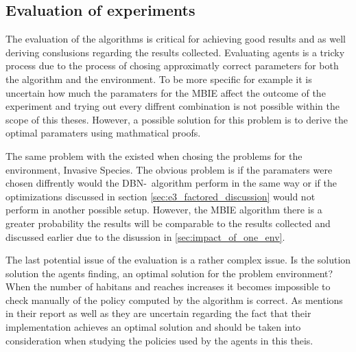 \subsection{Evaluation of experiments }
The evaluation of the algorithms is critical for achieving good results and as well deriving conslusions regarding the results collected. Evaluating agents is a tricky process due to the process of chosing approximatly correct parameters for both the algorithm and the environment. To be more specific for example it is uncertain how much the paramaters for the MBIE affect the outcome of the experiment and trying out every diffrent combination is not possible within the scope of this theses. However, a possible solution for this problem is to derive the optimal paramaters using mathmatical proofs.

The same problem with the existed when chosing the problems for the environment, Invasive Species. The obvious problem is if the paramaters were chosen diffrently would the DBN-\etre\ algorithm perform in the same way or if the optimizations discussed in section \ref{sec:e3_factored_discussion} would not perform in another possible setup. However, the MBIE algorithm there is a greater probability the results will be comparable to the results collected and discussed earlier due to the disussion in \ref{sec:impact_of_one_env}.

The last potential issue of the evaluation is a rather complex issue. Is the solution solution the agents finding, an optimal solution for the problem environment? When the number of habitans and reaches increases it becomes impossible to check manually of the policy computed by the algorithm is correct. As \textcite{dietterich2013pac} mentions in their report as well as they are uncertain regarding the fact that their implementation achieves an optimal solution and should be taken into consideration when studying the policies used by the agents in this theis.